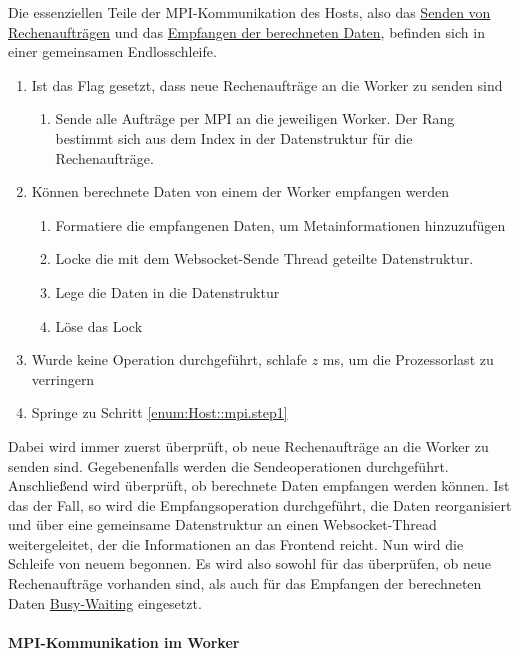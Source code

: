 Die essenziellen Teile der MPI-Kommunikation des Hosts, also das \hyperref[para:send_host]{Senden von Rechenaufträgen} und das \hyperref[para:recv_host]{Empfangen der berechneten Daten}, befinden sich in einer gemeinsamen Endlosschleife.
\begin{enumerate}
	\item Ist das Flag gesetzt, dass neue Rechenaufträge an die Worker zu senden sind \label{enum:Host::mpi.step1}
	\begin{enumerate}
		\item Sende alle Aufträge per MPI an die jeweiligen Worker. Der Rang bestimmt sich aus dem Index in der Datenstruktur für die Rechenaufträge.
	\end{enumerate}
	\item Können berechnete Daten von einem der Worker empfangen werden
	\begin{enumerate}
		\item Formatiere die empfangenen Daten, um Metainformationen hinzuzufügen
		\item Locke die mit dem Websocket-Sende Thread geteilte Datenstruktur.
		\item Lege die Daten in die Datenstruktur
		\item Löse das Lock
	\end{enumerate}
	\item Wurde keine Operation durchgeführt, schlafe $z$ ms, um die Prozessorlast zu verringern
	\item Springe zu Schritt \ref{enum:Host::mpi.step1}
\end{enumerate}

Dabei wird immer zuerst überprüft, ob neue Rechenaufträge an die Worker zu senden sind.
Gegebenenfalls werden die Sendeoperationen durchgeführt.
Anschließend wird überprüft, ob berechnete Daten empfangen werden können.
Ist das der Fall, so wird die Empfangsoperation durchgeführt, die Daten reorganisiert und über eine gemeinsame Datenstruktur an einen Websocket-Thread weitergeleitet, der die Informationen an das Frontend reicht.
Nun wird die Schleife von neuem begonnen.
Es wird also sowohl für das überprüfen, ob neue Rechenaufträge vorhanden sind, als auch für das Empfangen der berechneten Daten \hyperref[para:mpi_busy_waiting]{Busy-Waiting} eingesetzt.

\paragraph{MPI-Kommunikation im Worker}\label{para:mpi_generell_worker}

